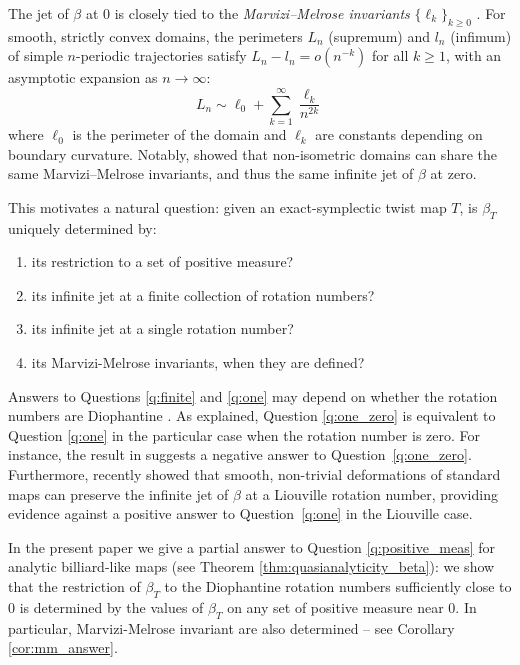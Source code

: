 \documentclass[10pt]{article}
\begin{document}
The jet of $\beta$ at $0$ is closely tied to the \textit{Marvizi--Melrose invariants} $\{\ell_k\}_{k\ge 0}$ \cite{MM, Siburg}. For smooth, strictly convex domains, the perimeters $L_n$ (supremum) and $l_n$ (infimum) of simple $n$-periodic trajectories satisfy $L_n - l_n = o(n^{-k})$ for all $k \ge 1$, with an asymptotic expansion as $n \to \infty$:
\[
    L_n \sim \ell_0 + \sum_{k=1}^{\infty} \frac{\ell_k}{n^{2k}}
\]
where $\ell_0$ is the perimeter of the domain and $\ell_k$ are constants depending on boundary curvature. Notably, \cite{BuchKalo} showed that non-isometric domains can share the same Marvizi--Melrose invariants, and thus the same infinite jet of $\beta$ at zero.

This motivates a natural question: given an exact-symplectic twist map $T$, is $\beta_T$ uniquely determined by:
\begin{enumerate}
    \item \label{q:positive_meas} its restriction to a set of positive measure?
    \item \label{q:finite} its infinite jet at a finite collection of rotation numbers?
    \item \label{q:one} its infinite jet at a single rotation number?
    \item \label{q:one_zero} its Marvizi-Melrose invariants, when they are defined?
\end{enumerate}
Answers to Questions \ref{q:finite} and \ref{q:one} may depend on whether the rotation numbers are Diophantine \cite{MM, FKS_ellipse, Yunzhe}. As explained, Question \ref{q:one_zero} is equivalent to Question \ref{q:one} in the particular case when the rotation number is zero. For instance, the result in \cite{BuchKalo} suggests a negative answer to Question~\ref{q:one_zero}. Furthermore, \cite{Yunzhe} recently showed that smooth, non-trivial deformations of standard maps can preserve the infinite jet of $\beta$ at a Liouville rotation number, providing evidence against a positive answer to Question~\ref{q:one} in the Liouville case.

\medskip 
In the present paper we give a partial answer to Question \ref{q:positive_meas} for analytic billiard-like maps (see Theorem \ref{thm:quasianalyticity_beta}): 
we show that the restriction of $\beta_T$ to the Diophantine rotation numbers sufficiently close to $0$ is determined by the values of $\beta_T$ on any set of positive measure near $0$. In particular, Marvizi-Melrose invariant are also determined -- see Corollary \ref{cor:mm_answer}.
\end{document}
